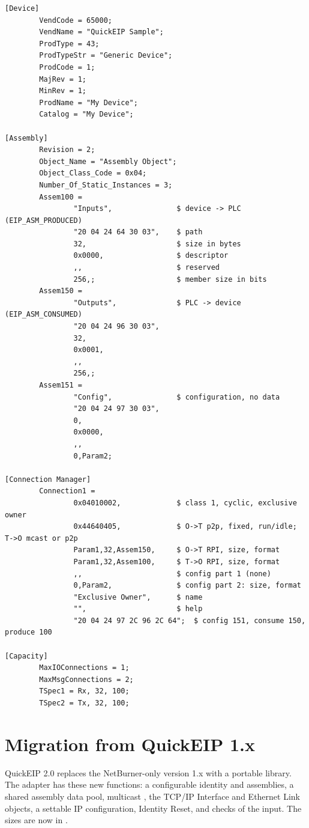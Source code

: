 \begin{lstlisting}[language=eds,basicstyle=\ttfamily\footnotesize]
[Device]
        VendCode = 65000;
        VendName = "QuickEIP Sample";
        ProdType = 43;
        ProdTypeStr = "Generic Device";
        ProdCode = 1;
        MajRev = 1;
        MinRev = 1;
        ProdName = "My Device";
        Catalog = "My Device";

[Assembly]
        Revision = 2;
        Object_Name = "Assembly Object";
        Object_Class_Code = 0x04;
        Number_Of_Static_Instances = 3;
        Assem100 =
                "Inputs",               $ device -> PLC (EIP_ASM_PRODUCED)
                "20 04 24 64 30 03",    $ path
                32,                     $ size in bytes
                0x0000,                 $ descriptor
                ,,                      $ reserved
                256,;                   $ member size in bits
        Assem150 =
                "Outputs",              $ PLC -> device (EIP_ASM_CONSUMED)
                "20 04 24 96 30 03",
                32,
                0x0001,
                ,,
                256,;
        Assem151 =
                "Config",               $ configuration, no data
                "20 04 24 97 30 03",
                0,
                0x0000,
                ,,
                0,Param2;

[Connection Manager]
        Connection1 =
                0x04010002,             $ class 1, cyclic, exclusive owner
                0x44640405,             $ O->T p2p, fixed, run/idle; T->O mcast or p2p
                Param1,32,Assem150,     $ O->T RPI, size, format
                Param1,32,Assem100,     $ T->O RPI, size, format
                ,,                      $ config part 1 (none)
                0,Param2,               $ config part 2: size, format
                "Exclusive Owner",      $ name
                "",                     $ help
                "20 04 24 97 2C 96 2C 64";  $ config 151, consume 150, produce 100

[Capacity]
        MaxIOConnections = 1;
        MaxMsgConnections = 2;
        TSpec1 = Rx, 32, 100;
        TSpec2 = Tx, 32, 100;
\end{lstlisting}

\section{Migration from QuickEIP 1.x}\label{sec:migration}

QuickEIP 2.0 replaces the NetBurner-only version 1.x with a portable library.
The adapter has these new functions: a configurable identity and
assemblies, a shared assembly data pool, multicast \TO, the TCP/IP Interface
and Ethernet Link objects, a settable IP configuration, Identity Reset, and
checks of the input. The sizes are now in .

